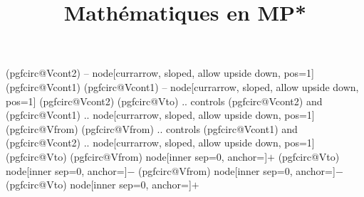 {\ifpgf@circuit@europeanvoltage
\ifpgf@circuit@germanvoltage
\ifpgf@circuit@bipole@voltage@backward
(pgfcirc@Vcont2)  -- node[currarrow, sloped,  allow upside down, pos=1] {} (pgfcirc@Vcont1)
\else
(pgfcirc@Vcont1)  -- node[currarrow, sloped,  allow upside down, pos=1] {} (pgfcirc@Vcont2)
\fi
\else
\ifpgf@circuit@bipole@voltage@backward
(pgfcirc@Vto) .. controls (pgfcirc@Vcont2)  and (pgfcirc@Vcont1) .. 
node[currarrow, sloped,  allow upside down, pos=1] {} 
(pgfcirc@Vfrom) 
\else
(pgfcirc@Vfrom) .. controls (pgfcirc@Vcont1)  and (pgfcirc@Vcont2) ..
node[currarrow, sloped,  allow upside down, pos=1] {}
(pgfcirc@Vto)   
\fi  
\fi      
\else
\ifpgf@circuit@bipole@voltage@backward
(pgfcirc@Vfrom) node[inner sep=0, anchor=\pgf@circ@bipole@voltage@label@anchor]{\scriptsize$+$}   
(pgfcirc@Vto) node[inner sep=0, anchor=\pgf@circ@bipole@voltage@label@anchor]{$-$}
\else
(pgfcirc@Vfrom) node[inner sep=0, anchor=\pgf@circ@bipole@voltage@label@anchor]{\scriptsize$-$}   
(pgfcirc@Vto) node[inner sep=0, anchor=\pgf@circ@bipole@voltage@label@anchor]{$+$}
\fi 
\fi
}
\makeatother

\author{}
\title{Mathématiques en MP*}


\newcommand{\HRule}{\rule{\linewidth}{0.5mm}}
\newcommand{\E}{\ensuremath{\vv{E}}}
\newcommand{\B}{\ensuremath{\vv{B}}}
\renewcommand{\emph}[1]{\textbf{\textcolor{Cerulean}{#1}}}
\renewcommand{\d}{\mathrm{d}}

\newcommand{\titre}[1]{\hfill \\[1.5\baselineskip] \begin{Large} %
\textbf{\textcolor{couleurFonce}{#1}}
\end{Large}\\[\baselineskip]}


\makeatletter
   \let\mytagform@=\tagform@
   \def\tagform@#1{\maketag@@@{\hbox{\llap{(\ignorespaces\textbf{\textcolor{RoyalBlue}{#1}}\unskip\@@italiccorr)\hspace{0.5\oddsidemargin}}}}\kern1sp} 
   \renewcommand{\eqref}[1]{{\mytagform@{\textcolor{BlueViolet}{\ref{#1}}}}}

\newcommand{\Attention}{\hfill \\
\hbox{\llap{(\ignorespaces \textbf{\textsc{Attention}}\unskip\@@italiccorr)\hspace{0.5\oddsidemargin}}}} %

